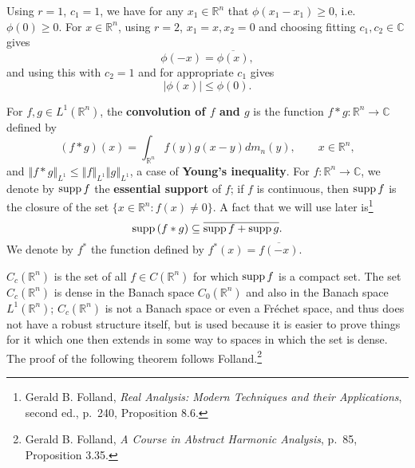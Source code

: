 \documentclass{article}
\newcommand{\supp}{\ensuremath\mathrm{supp}\,}
\newcommand{\norm}[1]{\left\Vert #1 \right\Vert}
\theoremstyle{definition}
\theoremstyle{definition}
\begin{document}
Using $r=1$, $c_1=1$, we have for any $x_1 \in \mathbb{R}^n$ that $\phi(x_1-x_1) \geq 0$, i.e. $\phi(0) \geq 0$. For $x \in \mathbb{R}^n$,
using $r=2$, $x_1=x, x_2=0$ and choosing fitting  $c_1,c_2 \in \mathbb{C}$ gives
\[
\phi(-x)=\overline{\phi(x)},
\]
and using this with $c_2=1$ and for appropriate $c_1$ gives
\[
|\phi(x)| \leq \phi(0).
\]

For $f,g \in L^1(\mathbb{R}^n)$, the \textbf{convolution of $f$ and $g$} is the function $f*g:\mathbb{R}^n \to \mathbb{C}$ defined by
\[
(f*g)(x) = \int_{\mathbb{R}^n} f(y)g(x-y) dm_n(y), \qquad x \in \mathbb{R}^n,
\]
and $\norm{f*g}_{L^1} \leq \norm{f}_{L^1} \norm{g}_{L^1}$, a case of \textbf{Young's inequality}.
For $f:\mathbb{R}^n \to \mathbb{C}$, we denote by $\supp f$ the \textbf{essential support} of $f$; if $f$ is continuous, then $\supp f$ is the closure of the set
$\{x \in \mathbb{R}^n: f(x) \neq 0\}$.
A fact that we will use later is\footnote{Gerald B. Folland, {\em Real
Analysis: Modern Techniques and their Applications}, second ed., p.~240, Proposition 8.6.}
\[
\supp(f*g) \subseteq \overline{\supp f + \supp g}.
\]
We denote by $f^*$ the function defined by $f^*(x)=\overline{f(-x)}$.

$C_c(\mathbb{R}^n)$ is the set of all $f \in C(\mathbb{R}^n)$ for which $\supp f$ is a compact set.
The set $C_c(\mathbb{R}^n)$ is dense in the Banach space
$C_0(\mathbb{R}^n)$  and also in the Banach space $L^1(\mathbb{R}^n)$; $C_c(\mathbb{R}^n)$ is not a Banach space or even a Fr\'echet space,
and thus does not have a robust structure itself, but is used because it is easier to prove things for it which one then extends in some way to spaces
in which the set is dense.
The proof of the following theorem
follows Folland.\footnote{Gerald B. Folland, {\em A Course in Abstract Harmonic Analysis}, p.~85, Proposition 3.35.}
\end{document}
